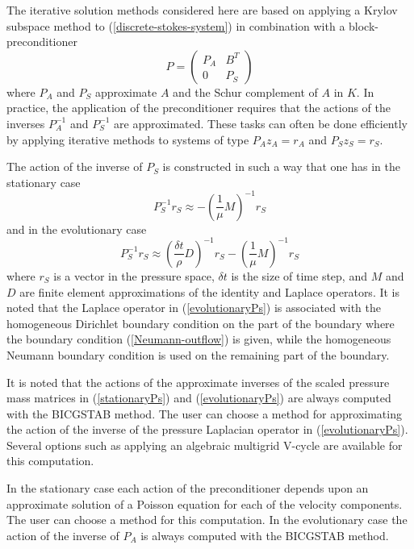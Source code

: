 The iterative solution methods considered here are based on applying a
Krylov subspace method to (\ref{discrete-stokes-system}) 
in combination with a block-preconditioner
\begin{equation}
P= \left( \begin{array}{cc} P_A           & B^T \\
                         0    & P_S   \end{array}\right)  
\end{equation}
where $P_A$ and $P_S$ 
approximate $A$ and the Schur complement of $A$ in $K$.  
In practice, the application of the preconditioner requires that the actions of the inverses 
$P_A^{-1}$ and $P_S^{-1}$ are approximated. 
These tasks can often be done efficiently by applying iterative methods to systems
of type $P_Az_A=r_A$ and $P_Sz_S=r_S$.

The action of the inverse of $P_S$ is constructed in such a way that one has 
in the stationary case \cite{Si94} 
\begin{equation}\label{stationaryPs}
P_S^{-1}r_S \approx -(\frac{1}{\mu}M)^{-1}r_S   
\end{equation}
and in the evolutionary case \cite{Ca88}
\begin{equation}\label{evolutionaryPs}
P_S^{-1}r_S \approx (\frac{\delta t}{\rho}D)^{-1}r_S - (\frac{1}{\mu}M)^{-1}r_S    
\end{equation}
where $r_S$ is a vector in the pressure space, $\delta t$ is the size of time step, and 
$M$ and $D$ are finite element approximations of the identity 
and Laplace operators. It is noted that the Laplace operator in (\ref{evolutionaryPs})
is associated with the homogeneous Dirichlet boundary condition on the part of the boundary
where the boundary condition (\ref{Neumann-outflow}) is given,
while the homogeneous Neumann boundary condition is used on the remaining part
of the boundary.

It is noted that 
the actions of the approximate inverses of the scaled pressure mass matrices in 
(\ref{stationaryPs}) and (\ref{evolutionaryPs}) are always computed 
with the BICGSTAB method. The user can choose a method for 
approximating the action of the inverse of the pressure Laplacian operator in (\ref{evolutionaryPs}).
Several options such as applying an algebraic multigrid V-cycle are available for this computation. 

In the stationary case each action of the preconditioner
depends upon an approximate solution of a Poisson equation for each of the velocity components.
The user can choose a method for this computation.  
In the evolutionary case the action of the inverse of $P_A$ 
is always computed with the BICGSTAB method. 

